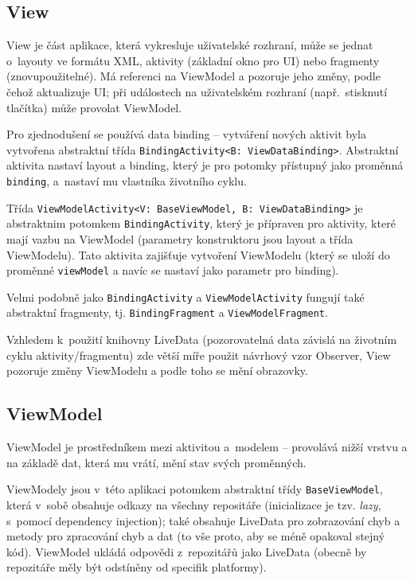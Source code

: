 \documentclass[twoside]{ctuthesis}
\begin{document}
\subsection{View}

View je část aplikace, která vykresluje uživatelské rozhraní, může se jednat o~layouty ve formátu XML, aktivity (základní okno pro UI) nebo fragmenty (znovupoužitelné). Má referenci na ViewModel a pozoruje jeho změny, podle čehož aktualizuje UI; při událostech na uživatelském rozhraní (např.~stisknutí tlačítka) může provolat ViewModel.

Pro zjednodušení se používá data binding --  vytváření nových aktivit byla vytvořena abstraktní třída \texttt{BindingActivity<B: ViewDataBinding>}. Abstraktní aktivita nastaví layout a binding, který je pro potomky přístupný jako proměnná \texttt{binding}, a~nastaví mu vlastníka životního cyklu.

Třída \texttt{ViewModelActivity<V: BaseViewModel, B:  ViewDataBinding>} je abstraktnim potomkem \texttt{BindingActivity}, který je přípraven pro aktivity, které mají vazbu na ViewModel (parametry konstruktoru jsou layout a třída ViewModelu). Tato aktivita zajišťuje vytvoření ViewModelu (který se uloží do proměnné \texttt{viewModel} a navíc se nastaví jako parametr pro binding).

Velmi podobně jako \texttt{BindingActivity} a \texttt{ViewModelActivity} fungují také abstraktní fragmenty, tj. \texttt{BindingFragment} a \texttt{ViewModelFragment}.

Vzhledem k~použití knihovny LiveData (pozorovatelná data závislá na životním cyklu aktivity/fragmentu) zde větší míře použit návrhový vzor Observer, View pozoruje změny ViewModelu a podle toho se mění obrazovky.

\subsection{ViewModel}

ViewModel je prostředníkem mezi aktivitou a~modelem -- provolává nižší vrstvu a na základě dat, která mu vrátí, mění stav svých proměnných.

ViewModely jsou v~této aplikaci potomkem abstraktní třídy \texttt{BaseViewModel}, která v~sobě obsahuje odkazy na všechny repositáře (inicializace je tzv. \textit{lazy}, s~pomocí dependency injection); také obsahuje LiveData pro zobrazování chyb a metody pro zpracování chyb a dat (to vše proto, aby se méně opakoval stejný kód). ViewModel ukládá odpovědi z~repozitářů jako LiveData (obecně by repozitáře měly být odstíněny od specifik platformy).
\end{document}
